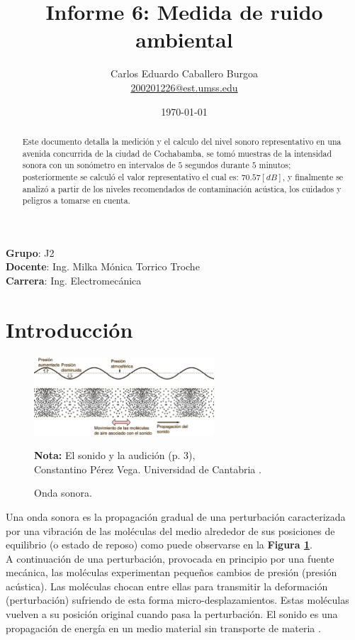 \documentclass[letter,11pt]{article}
\title{Informe 6: Medida de ruido ambiental}
\author{Carlos Eduardo Caballero Burgoa \\
    \small{\href{mailto:200201226@est.umss.edu}{200201226@est.umss.edu}}
}
\date{\today}
\newcommand{\source}[1]{\vspace{-11pt} \caption*{\small{\textbf{Nota:} {#1}}}}
\begin{document}
\maketitle
\begin{center}
    \textbf{Grupo}: J2\\
    \textbf{Docente}: Ing. Milka Mónica Torrico Troche\\
    \textbf{Carrera}: Ing. Electromecánica
\end{center}

\begin{abstract}
Este documento detalla la medición y el calculo del nivel sonoro representativo
en una avenida concurrida de la ciudad de Cochabamba, se tomó muestras de la
intensidad sonora con un sonómetro en intervalos de $5$ segundos durante $5$
minutos; posteriormente se calculó el valor representativo el cual es:
$70.57 [dB]$, y finalmente se analizó a partir de los niveles recomendados de
contaminación acústica, los cuidados y peligros a tomarse en cuenta.
\end{abstract}

\section{Introducción}

\begin{figure}
\centering
\includegraphics[width=0.60\textwidth]{resources/f1.eps}
\caption{Onda sonora.}
\label{figura1}
\source{El sonido y la audición (p. 3), \\
Constantino Pérez Vega. Universidad de Cantabria \cite{PEREZ}.}
\end{figure}

Una onda sonora es la propagación gradual de una perturbación caracterizada por
una vibración de las moléculas del medio alrededor de sus posiciones de
equilibrio (o estado de reposo) como puede observarse en la
\textbf{Figura \ref{figura1}}.
\\

A continuación de una perturbación, provocada en principio por una fuente
mecánica, las moléculas experimentan pequeños cambios de presión (presión
acústica). Las moléculas chocan entre ellas para transmitir la deformación
(perturbación) sufriendo de esta forma micro-desplazamientos. Estas moléculas
vuelven a su posición original cuando pasa la perturbación. El sonido es una
propagación de energía en un medio material sin transporte de materia
\cite{COCHLEA}.
\\
\end{document}
